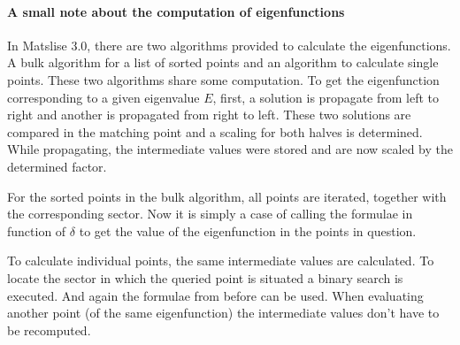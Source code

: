\paragraph{A small note about the computation of eigenfunctions}

In Matslise 3.0, there are two algorithms provided to calculate the eigenfunctions. A bulk algorithm for a list of sorted points and an algorithm to calculate single points. These two algorithms share some computation. To get the eigenfunction corresponding to a given eigenvalue $E$, first, a solution is propagate from left to right and another is propagated from right to left. These two solutions are compared in the matching point and a scaling for both halves is determined. While propagating, the intermediate values were stored and are now scaled by the determined factor.

For the sorted points in the bulk algorithm, all points are iterated, together with the corresponding sector. Now it is simply a case of calling the formulae in function of $\delta$ to get the value of the eigenfunction in the points in question.

To calculate individual points, the same intermediate values are calculated. To locate the sector in which the queried point is situated a binary search is executed. And again the formulae from before can be used. When evaluating another point (of the same eigenfunction) the intermediate values don't have to be recomputed.

